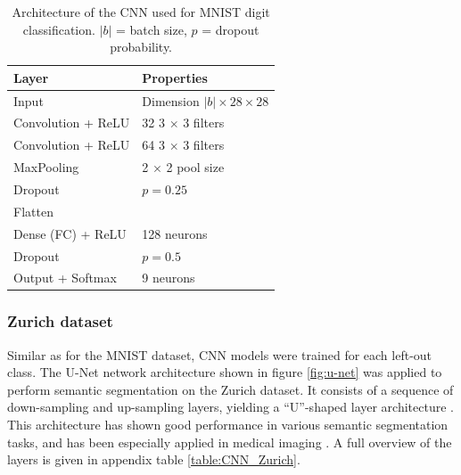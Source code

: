 \documentclass[10pt]{article}
\begin{document}
\begin{table}[H]
    \begin{center}
    \begin{tabular}{ll}
    \toprule
    Layer & Properties \\
    \hline
    Input & Dimension $|b| \times 28 \times 28$ \\ 
    Convolution + \gls{ReLU} & 32 3 $\times$ 3 filters\\
    Convolution + \gls{ReLU} & 64 3 $\times$ 3 filters\\
    MaxPooling & 2 $\times$ 2 pool size \\
    Dropout & $p = 0.25$ \\
    \hline
    Flatten & \\
    Dense (\gls{FC}) + \gls{ReLU} & 128 neurons\\
    Dropout & $p = 0.5$ \\
    Output + Softmax & 9 neurons \\
    \bottomrule
    \end{tabular}
    \caption{Architecture of the \gls{CNN} used for \gls{MNIST} digit classification. $|b|$ = batch size, $p$ = dropout probability.}
    \label{table:CNN_MNIST}
    \end{center}
\end{table}

\subsubsection{Zurich dataset} Similar as for the \gls{MNIST} dataset, \gls{CNN} models were trained for each left-out class. The U-Net network architecture shown in figure \ref{fig:u-net} was applied to perform semantic segmentation on the Zurich dataset. It consists of a sequence of down-sampling and up-sampling layers, yielding a ``U''-shaped layer architecture \cite{ronneberger2015u}. This architecture has shown good performance in various semantic segmentation tasks, and has been especially applied in medical imaging \cite{ronneberger2015u, Alom2018RecurrentRC, Dong2017AutomaticBT}. A full overview of the layers is given in appendix table  \ref{table:CNN_Zurich}.
\end{document}
